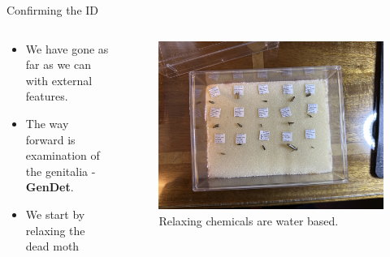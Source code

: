 \documentclass[
  ignorenonframetext,
]{beamer}
\providecommand{\tightlist}{%
  \setlength{\itemsep}{0pt}\setlength{\parskip}{0pt}}
\begin{document}
\begin{frame}{Confirming the ID}
\protect\hypertarget{confirming-the-id}{}
\begin{columns}[T]
\begin{column}{0.5\textwidth}
\begin{itemize}
\tightlist
\item
  We have gone as far as we can with external features.
\item
  The way forward is examination of the genitalia - \textbf{GenDet}.
\item
  We start by relaxing the dead moth
\end{itemize}
\end{column}

\begin{column}{0.5\textwidth}
\begin{figure}
\centering
\includegraphics{./images/relaxing.jpg}
\caption{Relaxing chemicals are water based.}
\end{figure}
\end{column}
\end{columns}
\end{frame}
\end{document}
